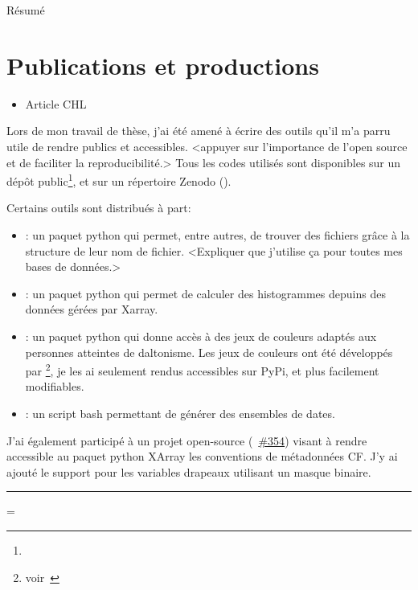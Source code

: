 
Résumé


\clearpage
\section{Publications et productions}
\label{sec:productions}

\begin{itemize}
        \item Article CHL
\end{itemize}
\medskip

Lors de mon travail de thèse, j'ai été amené à écrire des outils qu'il m'a parru utile de rendre publics et accessibles.
<appuyer sur l'importance de l'open source et de faciliter la reproducibilité.>
Tous les codes utilisés sont disponibles sur un dépôt public\footnote{%
}, et sur un répertoire Zenodo ().
\medskip

Certains outils sont distribués à part:
\begin{itemize}
  \item {}:
        un paquet python qui permet, entre autres, de trouver des fichiers grâce à la structure de leur nom de fichier.
        <Expliquer que j'utilise ça pour toutes mes bases de données.>
  \item {}:
        un paquet python qui permet de calculer des histogrammes depuins des données gérées par Xarray.
  \item {}:
        un paquet python qui donne accès à des jeux de couleurs adaptés aux personnes atteintes de daltonisme. Les jeux de couleurs ont été développés par \footnote{voir~}, je les ai seulement rendus accessibles sur PyPi, et plus facilement modifiables.
  \item {}:
        un script bash permettant de générer des ensembles de dates.
\end{itemize}
\medskip

J'ai également participé à un projet open-source (~\href{https://github.com/xarray-contrib/cf-xarray/pull/354}{\#354}) visant à rendre accessible au paquet python XArray les conventions de métadonnées CF.\@
J'y ai ajouté le support pour les variables drapeaux utilisant un masque binaire.

\begin{center}
  \vspace{1\baselineskip}
  \rule{0.77\textwidth}{0.5pt}
  \vspace{1\baselineskip}
\end{center}

{%
  \raggedright%
  \emergencystretch=\textwidth
  \printbibliography[heading=none, type=software, keyword=personnal]
}
